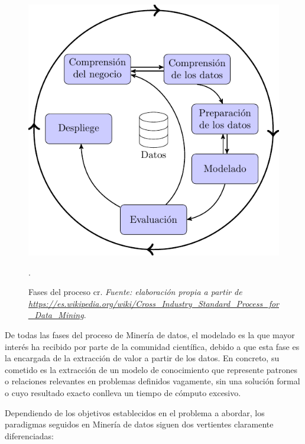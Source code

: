 \documentclass[c5paper,10pt,twoside]{book}	   	%
\begin{document}
\begin{figure}[!hbtp]
	\centering
	\includegraphics[width=0.5\linewidth]{./Figures/KDD2}
	\caption[Fases del proceso CRISP-DM]{Fases del proceso \ac{cr}. \textit{Fuente: elaboración propia a partir de \href{https://es.wikipedia.org/wiki/Cross\_Industry\_Standard\_Process\_for\_Data\_Mining}{https://es.wikipedia.org/wiki/Cross\_Industry\_Standard\_Process\_for\_Data\_Mining}}.}.
	\label{fig:kdd}
\end{figure}



De todas las fases del proceso de Minería de datos, el modelado es la que mayor interés ha recibido por parte de la comunidad científica, debido a que esta fase es la encargada de la extracción de valor a partir de los datos. En concreto, su cometido es la extracción de un modelo de conocimiento que represente patrones o relaciones relevantes en problemas definidos vagamente, sin una solución formal o cuyo resultado exacto conlleva un tiempo de cómputo excesivo.

Dependiendo de los objetivos establecidos en el problema a abordar, los paradigmas seguidos en Minería de datos siguen dos vertientes claramente diferenciadas: 
\end{document}
